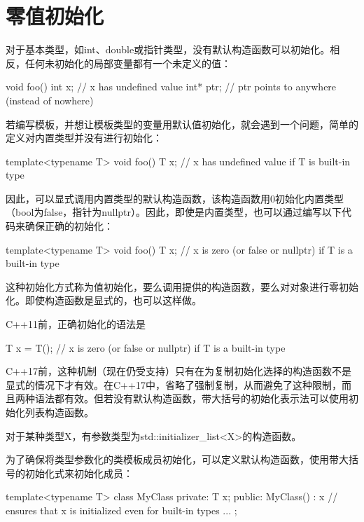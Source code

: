 \section{零值初始化}
对于基本类型，如int、double或指针类型，没有默认构造函数可以初始化。相反，任何未初始化的局部变量都有一个未定义的值：

\begin{cpp}
void foo()
{
	int x; // x has undefined value
	int* ptr; // ptr points to anywhere (instead of nowhere)
}
\end{cpp}

若编写模板，并想让模板类型的变量用默认值初始化，就会遇到一个问题，简单的定义对内置类型并没有进行初始化：

\begin{cpp}
template<typename T>
void foo()
{
	T x; // x has undefined value if T is built-in type
}
\end{cpp}

因此，可以显式调用内置类型的默认构造函数，该构造函数用0初始化内置类型（bool为false，指针为nullptr）。因此，即使是内置类型，也可以通过编写以下代码来确保正确的初始化：

\begin{cpp}
template<typename T>
void foo()
{
	T x{}; // x is zero (or false or nullptr) if T is a built-in type
}
\end{cpp}

这种初始化方式称为值初始化，要么调用提供的构造函数，要么对对象进行零初始化。即使构造函数是显式的，也可以这样做。

C++11前，正确初始化的语法是

\begin{cpp}
T x = T(); // x is zero (or false or nullptr) if T is a built-in type
\end{cpp}

C++17前，这种机制（现在仍受支持）只有在为复制初始化选择的构造函数不是显式的情况下才有效。在C++17中，省略了强制复制，从而避免了这种限制，而且两种语法都有效。但若没有默认构造函数，带大括号的初始化表示法可以使用初始化列表构造函数。

\begin{notice}
对于某种类型X，有参数类型为std::initializer\_list<X>的构造函数。
\end{notice}

为了确保将类型参数化的类模板成员初始化，可以定义默认构造函数，使用带大括号的初始化式来初始化成员：

\begin{cpp}
template<typename T>
class MyClass {
private:
	T x;
public:
	MyClass() : x{} { // ensures that x is initialized even for built-in types
	}
	...
};
\end{cpp}

